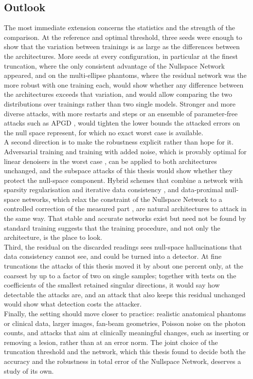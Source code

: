 \documentclass{article}
\numberwithin{equation}{section}
\begin{document}
\subsection{Outlook}\label{sec:outlook}
The most immediate extension concerns the statistics and the strength of the comparison. At the
reference and optimal threshold, three seeds were enough to show that the variation between trainings is
as large as the differences between the architectures. More seeds at every configuration, in particular at
the finest truncation, where the only consistent advantage of the Nullspace Network appeared, and on the
multi-ellipse phantoms, where the residual network was the more robust with one training each, would show
whether any difference between the architectures exceeds that variation, and would allow comparing the
two distributions over trainings rather than two single models. Stronger and more diverse
attacks, with more restarts and steps or an ensemble of parameter-free attacks such as APGD
\parencite{croce2020reliable}, would tighten the lower bounds the attacked errors on the null space
represent, for which no exact worst case is available.\\
A second direction is to make the robustness explicit rather than hope for it. Adversarial training
\parencite{raj2020improving} and training with added noise, which is provably optimal for linear
denoisers in the worst case \parencite{krainovic2023jittering}, can be applied to both architectures
unchanged, and the subspace attacks of this thesis would show whether they protect the null-space
component. Hybrid schemes that combine a network with sparsity regularisation and iterative data
consistency \parencite{wu2022stabilizingA}, and data-proximal null-space networks, which relax the
constraint of the Nullspace Network to a controlled correction of the measured part
\parencite{goeppel2023dataproximal,goeppel2025bvm}, are natural architectures to attack in the same way.
That stable and accurate networks exist but need not be found by standard training
\parencite{colbrook2022difficulty} suggests that the training procedure, and not only the architecture,
is the place to look.\\
Third, the residual on the discarded readings sees null-space hallucinations that data consistency
cannot see, and could be turned into a detector. At fine truncations the attacks of this thesis moved it
by about one percent only, at the coarsest by up to a factor of two on single samples; together with tests
on the coefficients of the smallest retained singular directions, it would say how detectable the attacks
are, and an attack that also keeps this residual unchanged would show what detection costs the attacker.\\
Finally, the setting should move closer to practice: realistic anatomical phantoms or clinical data,
larger images, fan-beam geometries, Poisson noise on the photon counts, and attacks that aim at
clinically meaningful changes, such as inserting or removing a lesion, rather than at an error norm. The
joint choice of the truncation threshold and the network, which this thesis found to decide both the
accuracy and the robustness in total error of the Nullspace Network, deserves a study of its own.
\end{document}
